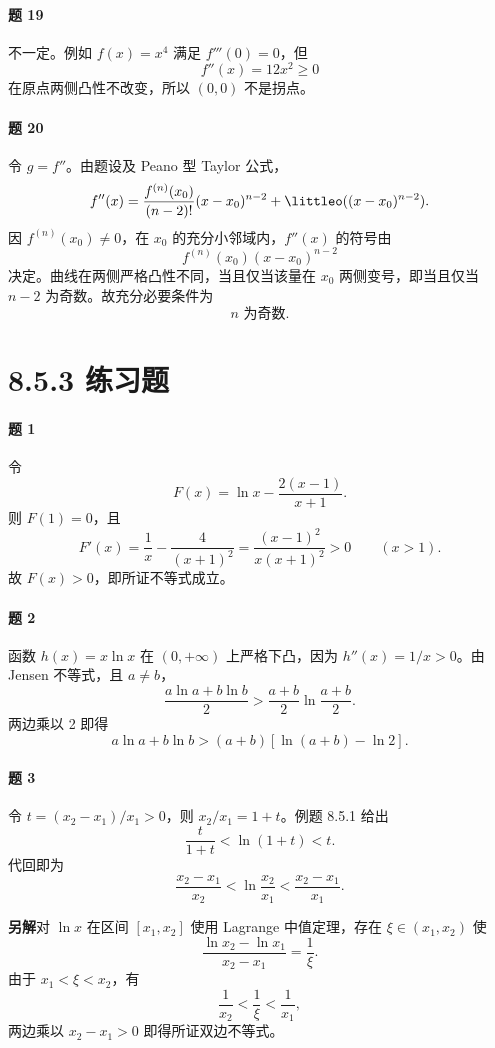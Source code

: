 \paragraph{题 19}
\begin{xsolution}
不一定。例如 $f(x)=x^4$ 满足 $f'''(0)=0$，但
\[
  f''(x)=12x^2\ge0
\]
在原点两侧凸性不改变，所以 $(0,0)$ 不是拐点。
\end{xsolution}

\paragraph{题 20}
\begin{xsolution}
令 $g=f''$。由题设及 Peano 型 Taylor 公式，
\[
  f''(x)
  =\frac{f^{(n)}(x_0)}{(n-2)!}(x-x_0)^{n-2}
   +\littleo((x-x_0)^{n-2}).
\]
因 $f^{(n)}(x_0)\ne0$，在 $x_0$ 的充分小邻域内，$f''(x)$ 的符号由
\[
  f^{(n)}(x_0)(x-x_0)^{n-2}
\]
决定。曲线在两侧严格凸性不同，当且仅当该量在 $x_0$ 两侧变号，即当且仅当 $n-2$ 为奇数。故充分必要条件为
\[
  \boxed{n\text{ 为奇数}}.
\]
\end{xsolution}

\section*{8.5.3 练习题}

\paragraph{题 1}
\begin{xsolution}
令
\[
  F(x)=\ln x-\frac{2(x-1)}{x+1}.
\]
则 $F(1)=0$，且
\[
  F'(x)=\frac1x-\frac4{(x+1)^2}
  =\frac{(x-1)^2}{x(x+1)^2}>0\qquad(x>1).
\]
故 $F(x)>0$，即所证不等式成立。
\end{xsolution}

\paragraph{题 2}
\begin{xsolution}
函数 $h(x)=x\ln x$ 在 $(0,+\infty)$ 上严格下凸，因为 $h''(x)=1/x>0$。由 Jensen 不等式，且 $a\ne b$，
\[
  \frac{a\ln a+b\ln b}{2}>
  \frac{a+b}{2}\ln\frac{a+b}{2}.
\]
两边乘以 2 即得
\[
  a\ln a+b\ln b>(a+b)[\ln(a+b)-\ln2].
\]
\end{xsolution}

\paragraph{题 3}
\begin{xsolution}
令 $t=(x_2-x_1)/x_1>0$，则 $x_2/x_1=1+t$。例题 8.5.1 给出
\[
  \frac{t}{1+t}<\ln(1+t)<t.
\]
代回即为
\[
  \frac{x_2-x_1}{x_2}<\ln\frac{x_2}{x_1}
  <\frac{x_2-x_1}{x_1}.
\]

\textbf{另解}\quad 对 $\ln x$ 在区间 $[x_1,x_2]$ 使用 Lagrange 中值定理，存在 $\xi\in(x_1,x_2)$ 使
\[
  \frac{\ln x_2-\ln x_1}{x_2-x_1}=\frac1\xi.
\]
由于 $x_1<\xi<x_2$，有
\[
  \frac1{x_2}<\frac1\xi<\frac1{x_1},
\]
两边乘以 $x_2-x_1>0$ 即得所证双边不等式。
\end{xsolution}


